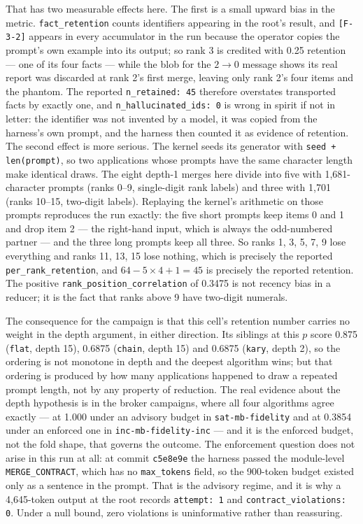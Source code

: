 \documentclass[11pt]{article}
\begin{document}
That has two measurable effects here. The first is a small upward bias in the metric.
\texttt{fact\_retention} counts identifiers appearing in the root's result, and
\texttt{[F-3-2]} appears in every accumulator in the run because the operator copies the
prompt's own example into its output; so rank 3 is credited with 0.25 retention --- one of
its four facts --- while the blob for the $2\to0$ message shows its real report was
discarded at rank 2's first merge, leaving only rank 2's four items and the phantom. The
reported \texttt{n\_retained: 45} therefore overstates transported facts by exactly one, and
\texttt{n\_hallucinated\_ids: 0} is wrong in spirit if not in letter: the identifier was not
invented by a model, it was copied from the harness's own prompt, and the harness then
counted it as evidence of retention. The second effect is more serious. The kernel seeds its
generator with \texttt{seed + len(prompt)}, so two applications whose prompts have the same
character length make identical draws. The eight depth-1 merges here divide into five with
1{,}681-character prompts (ranks 0--9, single-digit rank labels) and three with 1{,}701
(ranks 10--15, two-digit labels). Replaying the kernel's arithmetic on those prompts
reproduces the run exactly: the five short prompts keep items 0 and 1 and drop item 2 --- the
right-hand input, which is always the odd-numbered partner --- and the three long prompts
keep all three. So ranks 1, 3, 5, 7, 9 lose everything and ranks 11, 13, 15 lose nothing,
which is precisely the reported \texttt{per\_rank\_retention}, and
$64 - 5\times4 + 1 = 45$ is precisely the reported retention. The positive
\texttt{rank\_position\_correlation} of 0.3475 is not recency bias in a reducer; it is the
fact that ranks above 9 have two-digit numerals.

The consequence for the campaign is that this cell's retention number carries no weight in
the depth argument, in either direction. Its siblings at this $p$ score 0.875
(\texttt{flat}, depth 15), 0.6875 (\texttt{chain}, depth 15) and 0.6875 (\texttt{kary},
depth 2), so the ordering is not monotone in depth and the deepest algorithm wins; but
that ordering is produced by how many applications happened to draw a repeated prompt
length, not by any property of reduction. The real evidence about the depth hypothesis is in
the broker campaigns, where all four algorithms agree exactly --- at 1.000 under an
advisory budget in \texttt{sat-mb-fidelity} and at 0.3854 under an enforced one in
\texttt{inc-mb-fidelity-inc} --- and it is the enforced budget, not the fold shape, that
governs the outcome. The enforcement question does not arise in this run at all: at commit
\texttt{c5e8e9e} the harness passed the module-level \texttt{MERGE\_CONTRACT}, which has no
\texttt{max\_tokens} field, so the 900-token budget existed only as a sentence in the
prompt. That is the advisory regime, and it is why a 4{,}645-token output at the root
records \texttt{attempt: 1} and \texttt{contract\_violations: 0}. Under a null bound, zero
violations is uninformative rather than reassuring.
\end{document}
